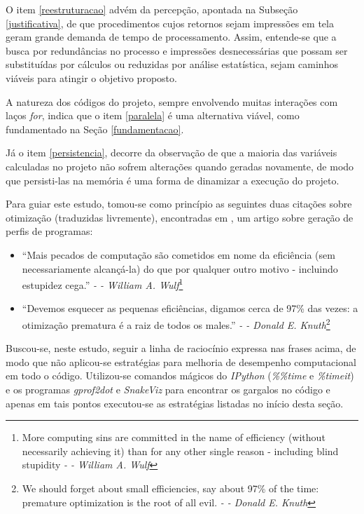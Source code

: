 \documentclass[12pt]{article}
\newcommand{\aspas}[1]{``#1''} %
\begin{document}
O item \ref{reestruturacao} advém da percepção, apontada na Subseção \ref{justificativa}, de que procedimentos cujos retornos sejam impressões em tela geram grande demanda de tempo de processamento. Assim, entende-se que a busca por redundâncias no processo e impressões desnecessárias que possam ser substituídas por cálculos ou reduzidas por análise estatística, sejam caminhos viáveis para atingir o objetivo proposto.

A natureza dos códigos do projeto, sempre envolvendo muitas interações com laços \textit{for}, indica que o item \ref{paralela} é uma alternativa viável, como fundamentado na Seção \ref{fundamentacao}.

Já o item \ref{persistencia}, decorre da observação de que a maioria das variáveis calculadas no projeto não sofrem alterações quando geradas novamente, de modo que persisti-las na memória é uma forma de dinamizar a execução do projeto.

Para guiar este estudo, tomou-se como princípio as seguintes duas citações sobre otimização (traduzidas livremente), encontradas em \cite{hegde:2004}, um artigo sobre geração de perfis de programas:

\begin{itemize}
	\item \aspas{Mais pecados de computação são cometidos em nome da eficiência (sem necessariamente alcançá-la) do que por qualquer outro motivo - incluindo estupidez cega.} \textit{- -  William A. Wulf}\footnote{More computing sins are committed in the name of efficiency (without necessarily achieving it) than for any other single reason - including blind stupidity \textit{- -  William A. Wulf}}
	\item \aspas{Devemos esquecer as pequenas eficiências, digamos cerca de 97\% das vezes: a otimização prematura é a raiz de todos os males.} \textit{- -  Donald E. Knuth}\footnote{We should forget about small efficiencies, say about 97\% of the time: premature optimization is the root of all evil. \textit{- -  Donald E. Knuth}}
\end{itemize}

Buscou-se, neste estudo, seguir a linha de raciocínio expressa nas frases acima, de modo que não aplicou-se estratégias para melhoria de desempenho computacional em todo o código. Utilizou-se comandos mágicos do \textit{IPython} (\textit{\%\%time} e \textit{\%timeit}) e os programas \textit{gprof2dot} e \textit{SnakeViz} para encontrar os gargalos no código e apenas em tais pontos executou-se as estratégias listadas no início desta seção.
\end{document}
